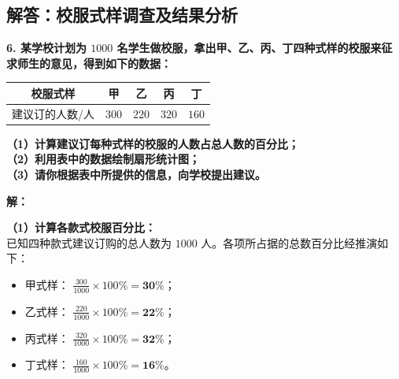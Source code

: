 ﻿%

\subsection{解答：校服式样调查及结果分析}

\vspace{0.6cm}

\textbf{6. 某学校计划为 $1000$ 名学生做校服，拿出甲、乙、丙、丁四种式样的校服来征求师生的意见，得到如下的数据：}

\vspace{0.2cm}
\begin{center}
\renewcommand{\arraystretch}{1.5}
\begin{tabular}{|c|c|c|c|c|}
  \hline
  \rowcolor{gray!15} 
  校服式样 & 甲 & 乙 & 丙 & 丁 \\
  \hline
  建议订的人数/人 & $300$ & $220$ & $320$ & $160$ \\
  \hline
\end{tabular}
\end{center}
\vspace{0.2cm}

\textbf{（1）计算建议订每种式样的校服的人数占总人数的百分比；}\\
\textbf{（2）利用表中的数据绘制扇形统计图；}\\
\textbf{（3）请你根据表中所提供的信息，向学校提出建议。}

\vspace{0.4cm}

\textbf{解：}

\textbf{（1）计算各款式校服百分比：} \\
已知四种款式建议订购的总人数为 $1000$ 人。各项所占据的总数百分比经推演如下：
\begin{itemize}
  \item 甲式样： $\frac{300}{1000} \times 100\% = \boldsymbol{30\%}$；
  \item 乙式样： $\frac{220}{1000} \times 100\% = \boldsymbol{22\%}$；
  \item 丙式样： $\frac{320}{1000} \times 100\% = \boldsymbol{32\%}$；
  \item 丁式样： $\frac{160}{1000} \times 100\% = \boldsymbol{16\%}$。
\end{itemize}

